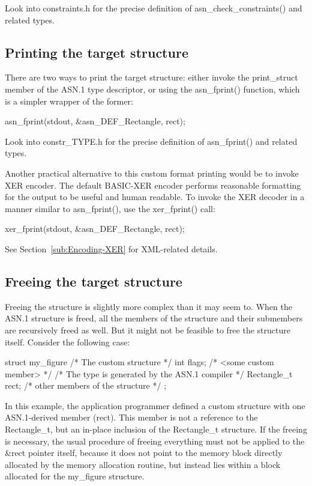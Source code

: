 \documentclass[english,oneside,12pt]{book}
\begin{document}
Look into constraints.h for the precise definition of asn\_check\_constraints()
and related types.


\subsection{\label{sub:Printing-the-target}Printing the target structure}

There are two ways to print the target structure: either invoke the
print\_struct member of the ASN.1 type descriptor, or using the asn\_fprint()
function, which is a simpler wrapper of the former:
\begin{codesample}
asn_fprint(stdout, &asn_DEF_Rectangle, rect);
\end{codesample}
Look into constr\_TYPE.h for the precise definition of asn\_fprint()
and related types.

Another practical alternative to this custom format printing would
be to invoke XER encoder. The default BASIC-XER encoder performs reasonable
formatting for the output to be useful and human readable. To invoke
the XER decoder in a manner similar to asn\_fprint(), use the xer\_fprint()
call:
\begin{codesample}
xer_fprint(stdout, &asn_DEF_Rectangle, rect);
\end{codesample}
See Section~\ref{sub:Encoding-XER} for XML-related details.


\subsection{\label{sub:Freeing-the-target}Freeing the target structure}

Freeing the structure is slightly more complex than it may seem to.
When the ASN.1 structure is freed, all the members of the structure
and their submembers are recursively freed as well. But it might not
be feasible to free the structure itself. Consider the following case:
\begin{codesample}
struct my_figure {       /* The custom structure */
    int flags;           /* <some custom member> */
    /* The type is generated by the ASN.1 compiler */
    Rectangle_t rect;
    /* other members of the structure */
};
\end{codesample}
In this example, the application programmer defined a custom structure
with one ASN.1-derived member (rect). This member is not a reference
to the Rectangle\_t, but an in-place inclusion of the Rectangle\_t
structure. If the freeing is necessary, the usual procedure of freeing
everything must not be applied to the \&rect pointer itself, because
it does not point to the memory block directly allocated by the memory
allocation routine, but instead lies within a block allocated for
the my\_figure structure.
\end{document}
